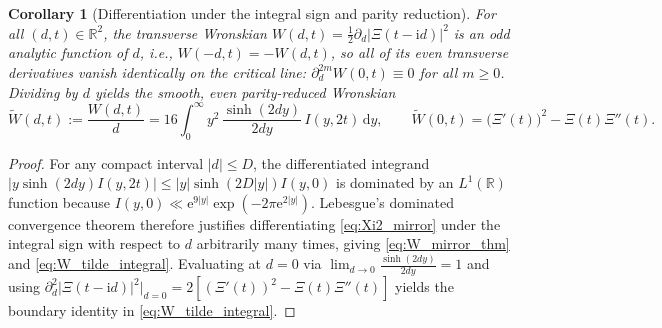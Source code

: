 \documentclass[11pt,a4paper,reqno]{amsart}
\newtheorem{corollary}[theorem]{Corollary}
\theoremstyle{definition}
\theoremstyle{remark}
\numberwithin{equation}{section}
\newcommand{\dd}{\mathrm{d}}
\newcommand{\ii}{\mathrm{i}}
\newcommand{\ee}{\mathrm{e}}
\newcommand{\Wtil}{\widetilde{W}}
\begin{document}
\begin{corollary}[Differentiation under the integral sign and parity reduction]\label{cor:W_tilde}
For all $(d,t) \in \mathbb{R}^2$, the transverse Wronskian $W(d,t) = \frac{1}{2}\partial_d|\Xi(t-\ii d)|^2$ is an odd analytic function of $d$, i.e., $W(-d,t) = -W(d,t)$, so all of its even transverse derivatives vanish identically on the critical line: $\partial_d^{2m} W(0,t) \equiv 0$ for all $m \ge 0$. Dividing by $d$ yields the smooth, even parity-reduced Wronskian
\begin{equation}\label{eq:W_tilde_integral}
\Wtil(d,t) := \frac{W(d,t)}{d} = 16\int_0^\infty y^2\,\frac{\sinh(2d y)}{2d y}\,I(y,2t)\,\dd y, \qquad \Wtil(0,t) = \big(\Xi'(t)\big)^2 - \Xi(t)\Xi''(t).
\end{equation}
\end{corollary}

\begin{proof}
For any compact interval $|d| \le D$, the differentiated integrand $|y\sinh(2d y) I(y,2t)| \le |y|\sinh(2D|y|) I(y,0)$ is dominated by an $L^1(\mathbb{R})$ function because $I(y,0) \ll \ee^{9|y|}\exp(-2\pi\ee^{2|y|})$. Lebesgue's dominated convergence theorem therefore justifies differentiating \eqref{eq:Xi2_mirror} under the integral sign with respect to $d$ arbitrarily many times, giving \eqref{eq:W_mirror_thm} and \eqref{eq:W_tilde_integral}. Evaluating at $d=0$ via $\lim_{d\to 0} \frac{\sinh(2d y)}{2d y} = 1$ and using $\partial_d^2|\Xi(t-\ii d)|^2\big|_{d=0} = 2[(\Xi'(t))^2 - \Xi(t)\Xi''(t)]$ yields the boundary identity in \eqref{eq:W_tilde_integral}.
\end{proof}
\end{document}
